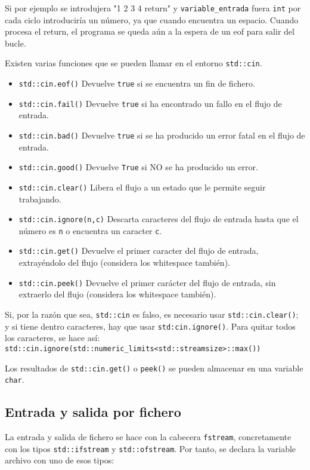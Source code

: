 \documentclass[a4paper]{article}
\begin{document}
	Si por ejemplo se introdujera "1 2 3 4 {return}" y \verb|variable_entrada| fuera \verb|int| por cada ciclo introduciría un número, ya que cuando encuentra un espacio. Cuando procesa el return, el programa se queda aún a la espera de un eof para salir del bucle.
	
	Existen varias funciones que se pueden llamar en el entorno \verb|std::cin|. 
	\begin{itemize}
		\item \verb|std::cin.eof()| Devuelve \verb|true| si se encuentra un fin de fichero.
		\item \verb|std::cin.fail()| Devuelve \verb|true| si ha encontrado un fallo en el flujo de entrada.
		\item \verb|std::cin.bad()| Devuelve \verb|true| si se ha producido un error fatal en el flujo de entrada.
		\item \verb|std::cin.good()| Devuelve \verb|True| si NO se ha producido un error.
		\item \verb|std::cin.clear()| Libera el flujo a un estado que le permite seguir trabajando.
		\item \verb|std::cin.ignore(n,c)| Descarta caracteres del flujo de entrada hasta que el número es \verb|n| o encuentra un caracter \verb|c|.
		\item \verb|std::cin.get()| Devuelve el primer caracter del flujo de entrada, extrayéndolo del flujo (considera los whitespace también).
		\item \verb|std::cin.peek()| Devuelve el primer carácter del flujo de entrada, sin extraerlo del flujo (considera los whitespace también).
	\end{itemize}
	
	Si, por la razón que sea, \verb|std::cin| es falso, es necesario usar \verb|std::cin.clear()|; y si tiene dentro caracteres, hay que usar \verb|std:cin.ignore()|. Para quitar todos los caracteres, se hace así: \verb|std::cin.ignore(std::numeric_limits<std::streamsize>::max())|
	
	Los resultados de \verb|std::cin.get()| o \verb|peek()| se pueden almacenar en una variable \verb|char|. 
	
	\subsection{Entrada y salida por fichero}
	La entrada y salida de fichero se hace con la cabecera \verb|fstream|, concretamente con los tipos \verb|std::ifstream| y \verb|std::ofstream|. Por tanto, se declara la variable archivo con uno de esos tipos:
	
\end{document}
